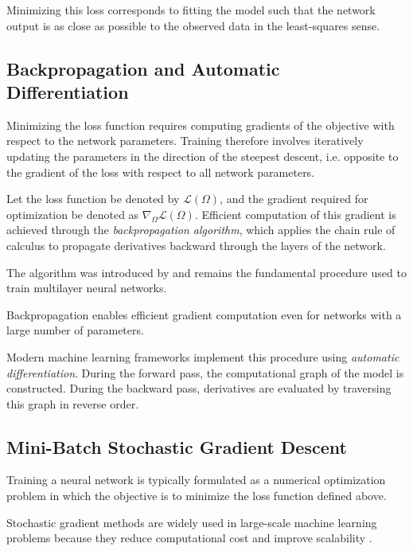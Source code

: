 Minimizing this loss corresponds to fitting the model such that the network output is as close as possible to the observed data in the least-squares sense.

\subsection{Backpropagation and Automatic Differentiation}

Minimizing the loss function requires computing gradients of the objective with respect to the network parameters. Training therefore involves iteratively updating the parameters in the direction of the steepest descent, i.e. opposite to the gradient of the loss with respect to all network parameters.

Let the loss function be denoted by $\mathcal{L}(\Omega)$, and the gradient required for optimization be denoted as $\nabla_{\Omega}\mathcal{L}(\Omega)$. Efficient computation of this gradient is achieved through the \emph{backpropagation algorithm}, which applies the chain rule of calculus to propagate derivatives backward through the layers of the network.

The algorithm was introduced by \citet{Rumelhart1986} and remains the fundamental procedure used to train multilayer neural networks.

Backpropagation enables efficient gradient computation even for networks with a large number of parameters.

Modern machine learning frameworks implement this procedure using \emph{automatic differentiation}. During the forward pass, the computational graph of the model is constructed. During the backward pass, derivatives are evaluated by traversing this graph in reverse order.


\subsection{Mini-Batch Stochastic Gradient Descent}

Training a neural network is typically formulated as a numerical optimization problem in which the objective is to minimize the loss function defined above.

Stochastic gradient methods are widely used in large-scale machine learning problems because they reduce computational cost and improve scalability \citep{Goodfellow2016}.

